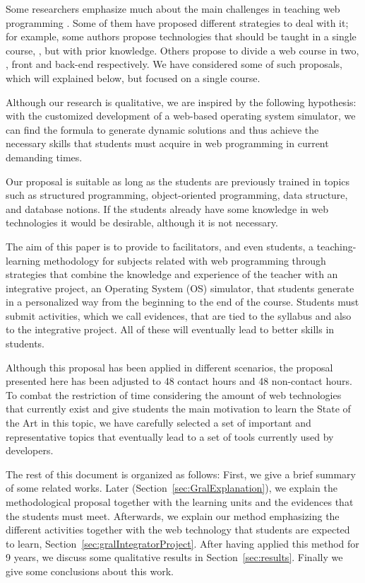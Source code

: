 Some researchers emphasize much about the main challenges in teaching web programming 
\cite{9Wang2009,7XinogalosK2012,4Liu2011,Douce2018}. 
Some of them have proposed different strategies to deal with it; for example, some 
authors propose technologies that should be taught in a single course, 
\cite{4Liu2011,10Rosenbloom2017}, but with prior knowledge. 
Others propose to divide a web course in two, \cite{9Wang2009}, front and back-end 
respectively. 
We have considered some of such proposals, which will explained below, but focused on 
a single course.

Although our research is qualitative, we are inspired by the following hypothesis: 
with the customized development of a web-based operating system simulator, we can 
find the formula to generate dynamic solutions and thus achieve the necessary skills 
that students must acquire in web programming in current demanding times.

Our proposal is suitable as long as the students are previously trained in topics 
such as structured programming, object-oriented programming, data structure, and database 
notions. If the students already have some knowledge in web technologies it would be 
desirable, although it is not necessary.

The aim of this paper is to provide to facilitators, and even students, 
a teaching-learning methodology for subjects related with web programming through 
strategies that combine the knowledge and experience of the teacher with an 
integrative project, an Operating System (OS) simulator, that students generate in a 
personalized way from the beginning to the end of the course. 
Students must submit activities, which we call evidences, that are tied to the  
syllabus and also to the integrative project. 
All of these will eventually lead to better skills in students.

Although this proposal has been applied in different scenarios, the proposal 
presented here has been adjusted to 48 contact hours and 48 non-contact hours. 
To combat the restriction of time considering the amount of web technologies that 
currently exist and give students the main motivation to learn the State of the Art 
in this topic, we have carefully selected a set of important and representative topics 
that eventually lead to a set of tools currently used by developers.

The rest of this document is organized as follows: 
First, we give a brief summary of some related works.
Later (Section~\ref{sec:GralExplanation}), we explain the methodological proposal 
    together with the learning units and the evidences that the students must meet.
Afterwards, we explain our method emphasizing the different activities together with 
    the web technology that students are expected to learn, 
    Section~\ref{sec:gralIntegratorProject}. 
After having applied this method for 9 years, we discuss some qualitative results in 
    Section~\ref{sec:results}.
Finally we give some conclusions about this work.


